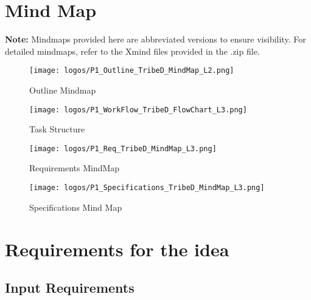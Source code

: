 \documentclass[table,french,english]{rapportCS}
\begin{document}
\renewcommand{\contentsname}{Table of contents}\label{sec:toc}
\toc
\newpage

\newpage
\newpage



\newpage


\newpage
\setcounter{figure}{0}
\section*{Mind Map}\label{sec:mindmap} 
\textbf{Note:} Mindmaps provided here are abbreviated versions to ensure visibility. For detailed mindmaps, refer to the Xmind files provided in the .zip file.
\vspace{2cm}
\begin{figure}[h]
    \centering
    \texttt{[image: logos/P1\_Outline\_TribeD\_MindMap\_L2.png]}
    \caption{Outline Mindmap }
    \label{fig:outlinemindmap}
\end{figure}
\begin{figure}
    \centering
    \texttt{[image: logos/P1\_WorkFlow\_TribeD\_FlowChart\_L3.png]}
    \caption{Task Structure}
    \label{fig:outlinemindmap}
\end{figure}
\begin{figure}[htbp]
  \centering
  \begin{adjustbox}{valign=c}
    \texttt{[image: logos/P1\_Req\_TribeD\_MindMap\_L3.png]} %
  \end{adjustbox}
  \caption{Requirements MindMap}
  \label{fig:reqmindmap}
\end{figure}
\begin{figure}
    \centering
    \texttt{[image: logos/P1\_Specifications\_TribeD\_MindMap\_L3.png]}
    \caption{Specifications Mind Map}
    \label{fig:specsmindmap}
\end{figure}

\newpage



\newpage
{}
\setcounter{page}{1} %
\section{Requirements for the idea}\label{sec:requirements}
    

\subsection{ Input Requirements}\label{sec:inputspec}
\end{document}
